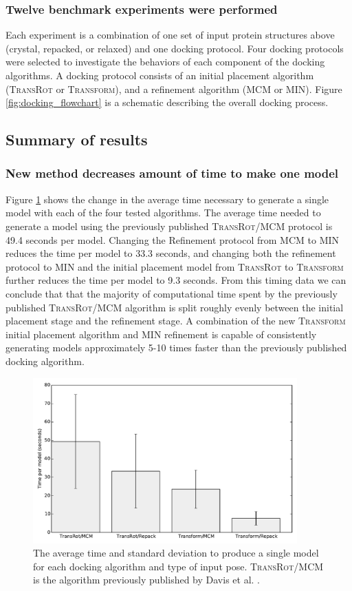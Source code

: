 \subsubsection{Twelve benchmark experiments were performed}
Each experiment is a combination of one set of input protein structures above (crystal, repacked, or relaxed) and one docking protocol.
Four docking protocols were selected to investigate the behaviors of each component of the docking algorithms.
A docking protocol consists of an initial placement algorithm (\textsc{TransRot} or \textsc{Transform}), and a refinement algorithm (\ac{MCM} or \ac{MIN}).
Figure \ref{fig:docking_flowchart} is a schematic describing the overall docking process. 

\subsection{Summary of results}
\subsubsection{New method decreases amount of time to make one model}
Figure \ref{fig:time_per_model} shows the change in the average time necessary to generate a single model with each of the four tested algorithms.
The average time needed to generate a model using the previously published \textsc{TransRot}/\ac{MCM} protocol is 49.4 seconds per model.
Changing the Refinement protocol from \ac{MCM} to \ac{MIN} reduces the time per model to 33.3 seconds, and changing both the refinement protocol to \ac{MIN} and the initial placement model from \textsc{TransRot} to \textsc{Transform} further reduces the time per model to 9.3 seconds.
From this timing data we can conclude that that the majority of computational time spent by the previously published \textsc{TransRot}/\ac{MCM} algorithm is split roughly evenly between the initial placement stage and the refinement stage.
A combination of the new \textsc{Transform} initial placement algorithm and \ac{MIN} refinement is capable of consistently generating models approximately 5-10 times faster than the previously published docking algorithm.

\begin{figure}
\centering
\includegraphics[width=4in]{figures/lowres/time_per_model.pdf}
\caption{
The average time and standard deviation to produce a single model for each docking algorithm and type of input pose.
\textsc{TransRot}/\acs{MCM} is the algorithm previously published by Davis et al. \citep{Davis:2009bf}. 
}
\label{fig:time_per_model}
\end{figure}


